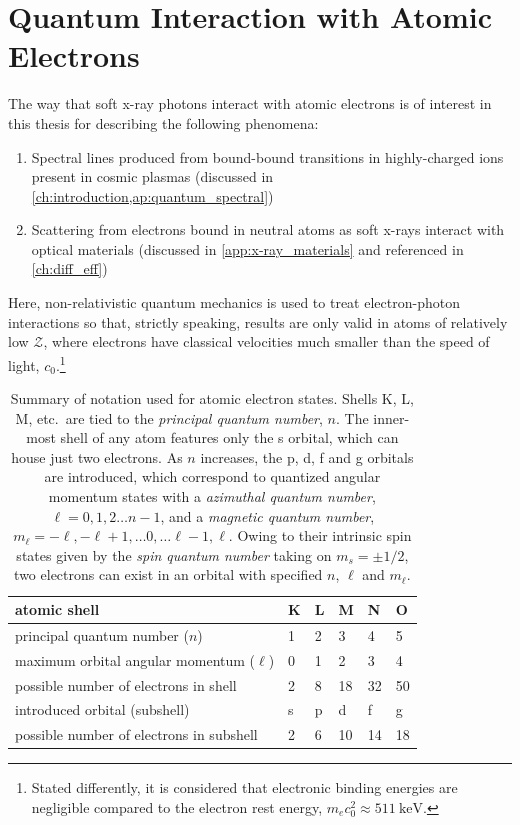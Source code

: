\section{Quantum Interaction with Atomic Electrons}\label{sec:atomic_interaction}
The way that soft x-ray photons interact with atomic electrons is of interest in this thesis for describing the following phenomena: 
\begin{enumerate}[noitemsep]
  \item Spectral lines produced from bound-bound transitions in highly-charged ions present in cosmic plasmas (discussed  in \cref{ch:introduction,ap:quantum_spectral})
  \item Scattering from electrons bound in neutral atoms as soft x-rays interact with optical materials (discussed in \cref{app:x-ray_materials} and referenced in \cref{ch:diff_eff})
 \end{enumerate}
Here, non-relativistic quantum mechanics is used to treat electron-photon interactions so that, strictly speaking, results are only valid in atoms of relatively low $\mathcal{Z}$, where electrons have classical velocities much smaller than the speed of light, $c_0$.\footnote{Stated differently, it is considered that electronic binding energies are negligible compared to the electron rest energy, $m_e c_0^2 \approx \SI{511}{\kilo\electronvolt}$.} 
\begin{table}[]
 \centering
 \caption[Summary of notation used for atomic electron states]{Summary of notation used for atomic electron states. Shells K, L, M, etc.\ are tied to the \emph{principal quantum number}, $n$. The inner-most shell of any atom features only the s orbital, which can house just two electrons. As $n$ increases, the p, d, f and g orbitals are introduced, which correspond to quantized angular momentum states with a \emph{azimuthal quantum number}, $\ell = 0, 1 , 2 \dotsc n-1$, and a \emph{magnetic quantum number}, $m_{\ell} = -\ell, -\ell + 1, \dotsc 0, \dotsc \ell -1, \ell$. Owing to their intrinsic spin states given by the \emph{spin quantum number} taking on $m_s = \pm 1/2$, two electrons can exist in an orbital with specified $n$, $\ell$ and $m_{\ell}$.}\label{tab:shell_orbitals} 
 \begin{tabular}{@{}llllll@{}} 
 \toprule
 atomic shell & K & L & M & N & O \\ \midrule
 principal quantum number ($n$) & 1 & 2 & 3 & 4 & 5 \\ 
 maximum orbital angular momentum ($\ell$) & 0 & 1 & 2 & 3 & 4  \\
 possible number of electrons in shell & 2 & 8 & 18 & 32 & 50 \\ \midrule
 introduced orbital (subshell) & s & p & d & f & g \\
 possible number of electrons in subshell & 2 & 6 & 10 & 14 & 18 \\
 \bottomrule
 \end{tabular}
 \end{table}
